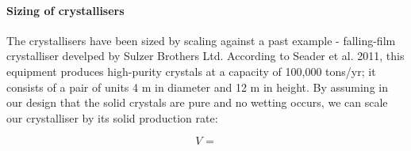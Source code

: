 \paragraph{Sizing of crystallisers}
The crystallisers have been sized by scaling against a past example - falling-film crystalliser develped by Sulzer Brothers Ltd. According to Seader et al. 2011, \cite{seader_separation_2011} this equipment produces high-purity crystals at a capacity of 100,000 tons/yr; it consists of a pair of units 4 m in diameter and 12 m in height. By assuming in our design that the solid crystals are pure and no wetting occurs, we can scale our crystalliser by its solid production rate:

\begin{equation}
    V_{} = 
    \label{crystalliser_sizing}
\end{equation}

